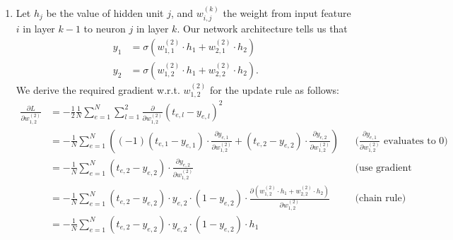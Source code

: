 \documentclass[11pt,a4paper]{article}
\begin{document}
\begin{enumerate}[label=(\alph*)]
          \begin{enumerate}[label=(\roman*)]
              \item Let $h_j$ be the value of hidden unit $j$, and
                    $w_{i,j}^{(k)}$ the weight from input feature $i$ in layer
                    $k-1$ to neuron $j$ in layer $k$.
                    Our network architecture tells us that
                    \begin{align*}
                        y_1 & = \sigma(w^{(2)}_{1,1}\cdot h_1 + w^{(2)}_{2,1}\cdot h_2)  \\
                        y_2 & = \sigma(w^{(2)}_{1,2}\cdot h_1 + w^{(2)}_{2,2}\cdot h_2).
                    \end{align*}
                    We derive the required gradient w.r.t. $w_{1,2}^{(2)}$ for
                    the update rule as follows:
                    \begin{align*}
                        \frac{\partial L}{\partial w_{1,2}^{(2)}} & = - \frac{1}{2}\frac{1}{N}\sum_{e=1}^N \sum_{l=1}^2 \frac{\partial}{\partial w_{1,2}^{(2)}} \left(t_{e,l}-y_{e,l}\right)^2                                                                                                                                                     \\
                                                                  & = - \frac{1}{N} \sum_{e=1}^{N} \left( (-1)(t_{e,1}-y_{e,1})\cdot \frac{\partial y_{e,1}}{\partial w_{1,2}^{(2)}} + (t_{e,2}-y_{e,2}) \cdot \frac{\partial y_{e,2}}{\partial w_{1,2}^{(2)}}  \right) &  & \text{($\frac{\partial y_{e,1}}{\partial w_{1,2}^{(2)}}$ evaluates to 0)} \\
                                                                  & = - \frac{1}{N} \sum_{e=1}^{N} (t_{e,2}-y_{e,2})\cdot\frac{\partial y_{e,2}}{\partial w_{1,2}^{(2)}}                                                                                            &  & \text{(use gradient from (b))}                                            \\
                                                                  & = - \frac{1}{N} \sum_{e=1}^{N} (t_{e,2}-y_{e,2})\cdot y_{e,2}\cdot\left(1-y_{e,2}\right) \cdot \frac{\partial (w^{(2)}_{1,2}\cdot h_1 + w^{(2)}_{2,2}\cdot h_2)}{\partial w_{1,2}^{(2)}}        &  & \text{(chain rule)}                                                       \\
                                                                  & = - \frac{1}{N} \sum_{e=1}^{N} (t_{e,2}-y_{e,2})\cdot y_{e,2}\cdot\left(1-y_{e,2}\right) \cdot h_1                                                                                                                                                                             \\

\end{align*}
\end{enumerate}
\end{enumerate}
\end{document}
